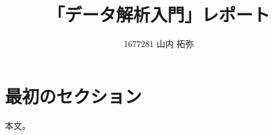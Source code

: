 \documentclass{jarticle}
\begin{document}
\title{「データ解析入門」レポート}
\author{1677281 山内 拓弥}

\section{最初のセクション}
本文。
\end{document}

